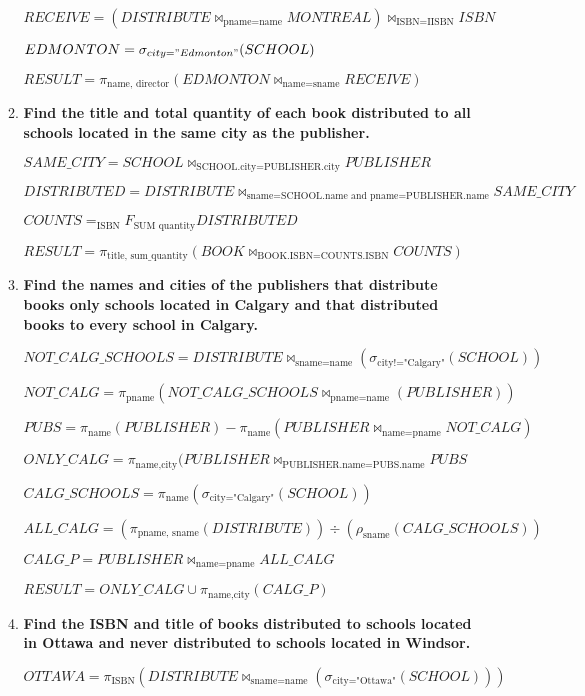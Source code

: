 \documentclass[11pt]{article}
\begin{document}
\begin{enumerate}
\begin{enumerate}
	$RECEIVE = (DISTRIBUTE \Join_{\text{pname=name}} MONTREAL) \Join_{\text{ISBN=IISBN}}ISBN$
	
	$EDMONTON = \sigma_{city="Edmonton"}(SCHOOL)$
	
	$RESULT = \pi_{\text{name, director}}(EDMONTON \Join_{\text{name=sname}} RECEIVE)$

	\item \textbf{Find the title and total quantity of each book distributed to all schools located in the same city as the publisher.}
	
	$SAME\_CITY = SCHOOL \Join_{\text{SCHOOL.city=PUBLISHER.city}} PUBLISHER$

	$DISTRIBUTED = DISTRIBUTE \Join_{\text{sname=SCHOOL.name and pname=PUBLISHER.name}} SAME\_CITY$

	$COUNTS = _{\text{ISBN}}F_{\text{SUM quantity}} DISTRIBUTED$
	
	$RESULT = \pi_{\text{title, sum\_quantity}} (BOOK \Join_{\text{BOOK.ISBN=COUNTS.ISBN}} COUNTS)$
	
	\item \textbf{Find the names and cities of the publishers that distribute books only schools located in Calgary and that distributed books to every school in Calgary.}
	
	$NOT\_CALG\_SCHOOLS = DISTRIBUTE \Join_{\text{sname=name}} (\sigma_{\text{city!="Calgary"}}(SCHOOL))$
	
	$NOT\_CALG = \pi_{\text{pname}} (NOT\_CALG\_SCHOOLS \Join_{\text{pname=name}}(PUBLISHER))$
	
	$PUBS=\pi_{\text{name}}(PUBLISHER) - \pi_{\text{name}}(PUBLISHER \Join_{\text{name=pname}}NOT\_CALG)$
	
	$ONLY\_CALG=\pi_{\text{name,city}}(PUBLISHER \Join_{\text{PUBLISHER.name=PUBS.name}} PUBS$
	
	$CALG\_SCHOOLS = \pi_{\text{name}}(\sigma_{\text{city="Calgary"}}(SCHOOL))$
	
	$ALL\_CALG = (\pi_{\text{pname, sname}} (DISTRIBUTE)) \div (\rho_{\text{sname}}(CALG\_SCHOOLS))$
	
	$CALG\_P=PUBLISHER \Join_{\text{name=pname}} ALL\_CALG$
	
	$RESULT=ONLY\_CALG \cup \pi_{\text{name,city}} (CALG\_P)$
	
	\item \textbf{Find the ISBN and title of books distributed to schools located in Ottawa and never distributed to schools located in Windsor.}
	
	$OTTAWA=\pi_{\text{ISBN}}(DISTRIBUTE\Join_{\text{sname=name}}(\sigma_{\text{city="Ottawa"}}(SCHOOL)))$
	

\end{enumerate}
\end{enumerate}
\end{document}
